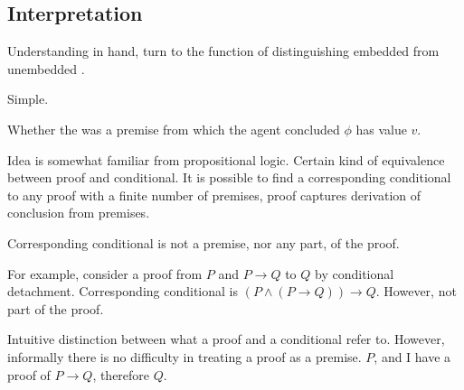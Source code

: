 \subsection{Interpretation}
\label{cha:var:ros:Emb:interpretation}

\begin{note}
  Understanding in hand, turn to the function of distinguishing embedded from unembedded \ros{}.

  Simple.

  Whether the \ros{} was a premise from which the agent concluded \(\phi\) has value \(v\).
\end{note}

\begin{note}
  Idea is somewhat familiar from propositional logic.
  Certain kind of equivalence between proof and conditional.
  It is possible to find a corresponding conditional to any proof with a finite number of premises, proof captures derivation of conclusion from premises.

  Corresponding conditional is not a premise, nor any part, of the proof.

  For example, consider a proof from \(P\) and \(P \rightarrow Q\) to \(Q\) by conditional detachment.
  Corresponding conditional is \((P \land (P \rightarrow Q)) \rightarrow Q\).
  However, not part of the proof.

  Intuitive distinction between what a proof and a conditional refer to.
  However, informally there is no difficulty in treating a proof as a premise.
  \(P\), and I have a proof of \(P \rightarrow Q\), therefore \(Q\).
\end{note}

